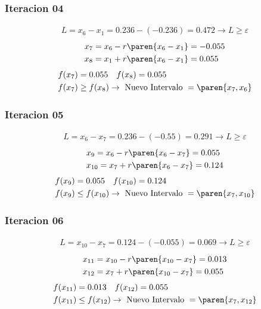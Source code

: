\begin{homeworkProblem}
\subsubsection{Iteracion 04}
\begin{align*}
    L=x_6-x_1=0.236-(-0.236)=0.472 \rightarrow L \geq \varepsilon
\end{align*}
\begin{align*}
    &x_7=x_6 - r\paren{x_6-x_1}= -0.055 \\
    &x_8=x_1 + r\paren{x_6-x_1}= 0.055
\end{align*}
\begin{align*}
    &f(x_7)=0.055 \quad f(x_8)=0.055 \\
    &f(x_7) \geq f(x_8) \rightarrow \text{ Nuevo Intervalo } = \paren{x_7,x_6}
\end{align*}

\subsubsection{Iteracion 05}
\begin{align*}
    L=x_6-x_7=0.236-(-0.55)=0.291 \rightarrow L \geq \varepsilon
\end{align*}
\begin{align*}
    &x_9=x_6 - r\paren{x_6-x_7}= 0.055\\
    &x_{10}=x_7 + r\paren{x_6-x_7}= 0.124
\end{align*}
\begin{align*}
    &f(x_9)=0.055 \quad f(x_{10})=0.124 \\
    &f(x_9) \leq f(x_{10}) \rightarrow \text{ Nuevo Intervalo } = \paren{x_7,x_{10}}
\end{align*}


\subsubsection{Iteracion 06}
\begin{align*}
    L=x_{10}-x_7=0.124-(-0.055)=0.069 \rightarrow L \geq \varepsilon
\end{align*}
\begin{align*}
    &x_{11}=x_{10} - r\paren{x_{10}-x_7}= 0.013\\
    &x_{12}=x_7 + r\paren{x_{10}-x_7}= 0.055
\end{align*}
\begin{align*}
    &f(x_{11})=0.013 \quad f(x_{12})=0.055 \\
    &f(x_{11}) \leq f(x_{12}) \rightarrow \text{ Nuevo Intervalo } = \paren{x_7,x_{12}}
\end{align*}


\end{homeworkProblem}
